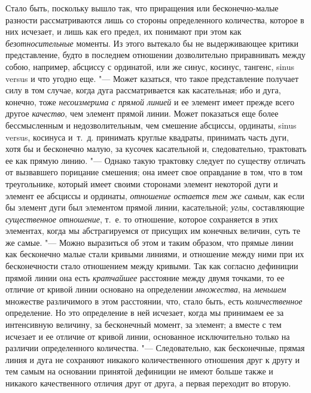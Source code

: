 Стало быть, поскольку вышло так, что приращения или бесконечно-малые
разности рассматриваются лишь со стороны определенного количества, которое
в них исчезает, и лишь как его предел, их понимают при этом как
{\em безотносительные} моменты. Из этого вытекало бы не
выдерживающее критики представление, будто в последнем отношении
дозволительно приравнивать между собою, например, абсциссу с ординатой, или
же синус, косинус, тангенс, sinus versus и что угодно еще. "--- Может
казаться, что такое представление получает силу в том случае, когда дуга
рассматривается как касательная; ибо и дуга, конечно, тоже
{\em несоизмерима с прямой линией} и ее элемент имеет
прежде всего другое {\em качество}, чем элемент прямой
линии. Может показаться еще более бессмысленным и недозволительным, чем
смешение абсциссы, ординаты, sinus versus, косинуса и~т.~д. принимать
круглые квадраты, принимать часть дуги, хотя бы и бесконечно малую, за
кусочек касательной и, следовательно, трактовать ее как прямую линию.
"--- Однако такую трактовку следует по существу отличать от вызвавшего
порицание смешения; она имеет свое оправдание в том, что в том треугольнике,
который имеет своими сторонами элемент некоторой дуги и элемент ее абсциссы
и ординаты, {\em отношение остается тем же самым}, как
если бы элемент дуги был элементом прямой линии, касательной;
{\em углы}, составляющие
{\em существенное отношение}, т.~е. то отношение,
которое сохраняется в этих элементах, когда мы абстрагируемся от присущих
им конечных величин, суть те же самые. "--- Можно выразиться об этом и таким
образом, что прямые линии как бесконечно малые стали кривыми линиями, и
отношение между ними при их бесконечности стало отношением между кривыми.
Так как согласно дефиниции прямой линии она есть
{\em кратчайшее} расстояние между двумя точками, то ее
отличие от кривой линии основано на определении
{\em множества}, на {\em меньшем}
множестве различимого в этом расстоянии, что, стало быть, есть
{\em количественное} определение. Но это определение в
ней исчезает, когда мы принимаем ее за интенсивную величину, за бесконечный
момент, за элемент; а вместе с тем исчезает и ее отличие от кривой линии,
основанное исключительно только на различии определенного количества.
"--- Следовательно, как бесконечные,
прямая линия и дуга не сохраняют никакого
количественного отношения друг к другу и тем самым на основании принятой
дефиниции не имеют больше также и никакого качественного отличия друг от
друга, а первая переходит во вторую.

